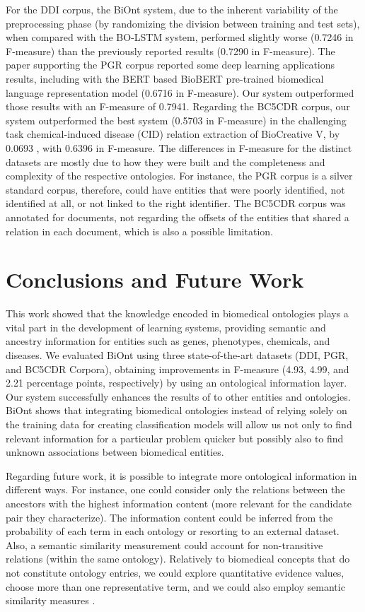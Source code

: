 For the DDI corpus, the BiOnt system, due to the inherent variability of the preprocessing phase (by randomizing the division between training and test sets), when compared with the BO-LSTM system, performed slightly worse (0.7246 in F-measure) than the previously reported results (0.7290 in F-measure).
The paper supporting the PGR corpus \citep{sousa2019silver} reported some deep learning applications results, including with the BERT \citep{devlin2019bert} based BioBERT \citep{lee2020biobert} pre-trained biomedical language representation model (0.6716 in F-measure). Our system outperformed those results with an F-measure of 0.7941.
Regarding the BC5CDR corpus, our system outperformed the best system (0.5703 in F-measure) in the challenging task chemical-induced disease (CID) relation extraction of BioCreative V, by 0.0693 \citep{inproceedingscdr}, with 0.6396 in F-measure. 
The differences in F-measure for the distinct datasets are mostly due to how they were built and the completeness and complexity of the respective ontologies. 
For instance, the PGR corpus is a silver standard corpus, therefore, could have entities that were poorly identified, not identified at all, or not linked to the right identifier. The BC5CDR corpus was annotated for documents, not regarding the offsets of the entities that shared a relation in each document, which is also a possible limitation.


\section{Conclusions and Future Work}

This work showed that the knowledge encoded in biomedical ontologies plays a vital part in the development of learning systems, providing semantic and ancestry information for entities such as genes, phenotypes, chemicals, and diseases. We evaluated BiOnt using three state-of-the-art datasets (DDI, PGR, and BC5CDR Corpora), obtaining improvements in F-measure (4.93, 4.99, and 2.21 percentage points, respectively) by using an ontological information layer. Our system successfully enhances the results of \cite{lamurias2019bo} to other entities and ontologies. BiOnt shows that integrating biomedical ontologies instead of relying solely on the training data for creating classification models will allow us not only to find relevant information for a particular problem quicker but possibly also to find unknown associations between biomedical entities.

Regarding future work, it is possible to integrate more ontological information in different ways. For instance, one could consider only the relations between the ancestors with the highest information content (more relevant for the candidate pair they characterize). The information content could be inferred from the probability of each term in each ontology or resorting to an external dataset. Also, a semantic similarity measurement could account for non-transitive relations (within the same ontology). Relatively to biomedical concepts that do not constitute ontology entries, we could explore quantitative evidence values, choose more than one representative term, and we could also employ semantic similarity measures \citep{COUTO2019870}.